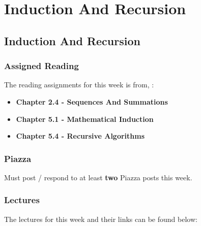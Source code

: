 \clearpage

\renewcommand{\ChapTitle}{Induction And Recursion}
\renewcommand{\SectionTitle}{Induction And Recursion}

\chapter{\ChapTitle}
\section{\SectionTitle}

\subsection{Assigned Reading}

The reading assignments for this week is from, \Textbook:

\begin{itemize}
    \item \textbf{Chapter 2.4 - Sequences And Summations}
    \item \textbf{Chapter 5.1 - Mathematical Induction}
    \item \textbf{Chapter 5.4 - Recursive Algorithms}
\end{itemize}

\subsection{Piazza}

Must post / respond to at least \textbf{two} Piazza posts this week.

\subsection{Lectures}

The lectures for this week and their links can be found below:

